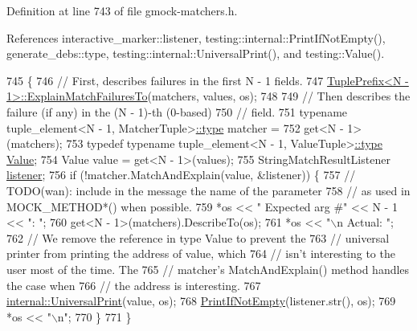 Definition at line 743 of file gmock-\/matchers.\+h.



References interactive\+\_\+marker\+::listener, testing\+::internal\+::\+Print\+If\+Not\+Empty(), generate\+\_\+debs\+::type, testing\+::internal\+::\+Universal\+Print(), and testing\+::\+Value().


\begin{DoxyCode}
745                                                      \{
746     \textcolor{comment}{// First, describes failures in the first N - 1 fields.}
747     \hyperlink{classtesting_1_1internal_1_1TuplePrefix_a0ffd38ce90ae6da645a5655aefac5bb7}{TuplePrefix<N - 1>::ExplainMatchFailuresTo}(matchers, values, 
      os);
748 
749     \textcolor{comment}{// Then describes the failure (if any) in the (N - 1)-th (0-based)}
750     \textcolor{comment}{// field.}
751     \textcolor{keyword}{typename} tuple\_element<N - 1, MatcherTuple>\hyperlink{namespacegenerate__debs_a50bc9a7ecac9584553e089a448bcde58}{::type} matcher =
752         \textcolor{keyword}{get}<N - 1>(matchers);
753     \textcolor{keyword}{typedef} \textcolor{keyword}{typename} tuple\_element<N - 1, ValueTuple>\hyperlink{namespacegenerate__debs_a50bc9a7ecac9584553e089a448bcde58}{::type} \hyperlink{namespacetesting_ae44c50a3a7f0a46f05c8a0b0592b4a62}{Value};
754     Value value = \textcolor{keyword}{get}<N - 1>(values);
755     StringMatchResultListener \hyperlink{namespaceinteractive__marker_a0e579ab555212bb5e2c9f8a675b7618a}{listener};
756     \textcolor{keywordflow}{if} (!matcher.MatchAndExplain(value, &listener)) \{
757       \textcolor{comment}{// TODO(wan): include in the message the name of the parameter}
758       \textcolor{comment}{// as used in MOCK\_METHOD*() when possible.}
759       *os << \textcolor{stringliteral}{"  Expected arg #"} << N - 1 << \textcolor{stringliteral}{": "};
760       \textcolor{keyword}{get}<N - 1>(matchers).DescribeTo(os);
761       *os << \textcolor{stringliteral}{"\(\backslash\)n           Actual: "};
762       \textcolor{comment}{// We remove the reference in type Value to prevent the}
763       \textcolor{comment}{// universal printer from printing the address of value, which}
764       \textcolor{comment}{// isn't interesting to the user most of the time.  The}
765       \textcolor{comment}{// matcher's MatchAndExplain() method handles the case when}
766       \textcolor{comment}{// the address is interesting.}
767       \hyperlink{namespacetesting_1_1internal_a30708fa2bacf11895b03bdb21eb72309}{internal::UniversalPrint}(value, os);
768       \hyperlink{namespacetesting_1_1internal_afa4cd5d7933878d6d820b32c87bb2767}{PrintIfNotEmpty}(listener.str(), os);
769       *os << \textcolor{stringliteral}{"\(\backslash\)n"};
770     \}
771   \}
\end{DoxyCode}
